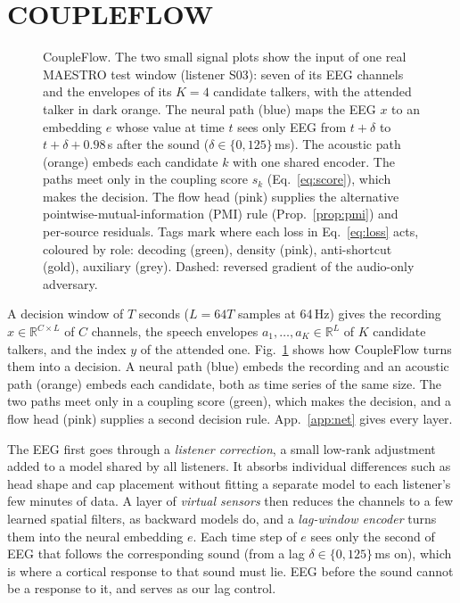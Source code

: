\documentclass[twoside]{article}
\begin{document}
\section{COUPLEFLOW}\label{sec:method}
\begin{figure}[!t]\centering
\resizebox{\textwidth}{!}{}
\caption{CoupleFlow. The two small signal plots show the input of one real MAESTRO test
window (listener S03): seven of its EEG channels and the envelopes of its $K=4$ candidate
talkers, with the attended talker in dark orange. The neural path (blue) maps the EEG $x$ to an
embedding $e$ whose value at time $t$ sees only EEG from $t+\delta$ to
$t+\delta+0.98$\,s after the sound ($\delta\in\{0,125\}$\,ms). The acoustic path (orange) embeds each
candidate $k$ with one shared encoder. The paths meet only in the coupling score $s_k$
(Eq.~\ref{eq:score}), which makes the decision. The flow head (pink) supplies the alternative
pointwise-mutual-information (PMI) rule (Prop.~\ref{prop:pmi}) and per-source residuals. Tags mark where each loss in
Eq.~\ref{eq:loss} acts, coloured by role: decoding (green), density (pink), anti-shortcut
(gold), auxiliary (grey). Dashed: reversed gradient of the audio-only adversary.}\label{fig:arch}
\end{figure}
A decision window of $T$ seconds ($L=64T$ samples at 64\,Hz) gives the recording
$x\in\mathbb{R}^{C\times L}$ of $C$ channels, the speech envelopes
$a_1,\dots,a_K\in\mathbb R^{L}$ of $K$ candidate talkers, and the index $y$ of the attended
one. Fig.~\ref{fig:arch} shows how CoupleFlow turns them into a decision. A neural path
(blue) embeds the recording and an acoustic path (orange) embeds each candidate, both as
time series of the same size. The two paths meet only in a coupling score (green), which
makes the decision, and a flow head (pink) supplies a second decision rule.
App.~\ref{app:net} gives every layer.

The EEG first goes through a \emph{listener correction}, a small low-rank adjustment added
to a model shared by all listeners. It absorbs individual differences such as head shape and
cap placement without fitting a separate model to each listener's few minutes of data. A
layer of \emph{virtual sensors} then reduces the channels to a few learned spatial filters,
as backward models do, and a \emph{lag-window encoder} turns them into the neural embedding
$e$. Each time step of $e$ sees only the second of EEG that follows the corresponding sound
(from a lag $\delta\in\{0,125\}$\,ms on), which is where a cortical response to that sound
must lie. EEG before the sound cannot be a response to it, and serves as our lag control.
\end{document}
